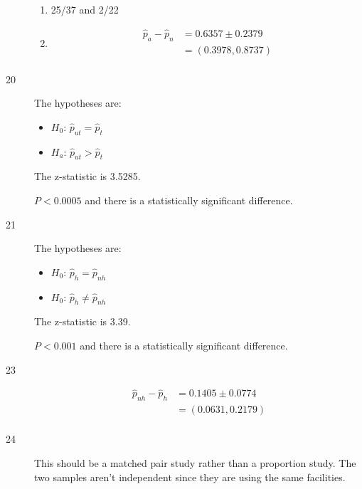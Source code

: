 \documentclass[letterpaper]{exam}
\begin{document}
\begin{description}
\begin{enumerate}[label = ({\alph*})]
          \item 25/37 and 2/22

          \item 
            \begin{align*}
              \hat{p}_{a} - \hat{p}_{n} & = 0.6357 \pm 0.2379 \\
                                        & = (0.3978, 0.8737) \\
            \end{align*}
        \end{enumerate}

      \item[20]
        The hypotheses are:
        \begin{itemize}[label = {}, itemsep = 0pt]
          \item $H_0$: $\hat{p}_{ut} = \hat{p}_{t}$
          \item $H_a$: $\hat{p}_{ut} > \hat{p}_{t}$
        \end{itemize}

        The z-statistic is 3.5285. 
        
        $P < 0.0005$ and there is a statistically significant difference. 

      \item[21]
        The hypotheses are:
        \begin{itemize}[label = {}, itemsep = 0pt]
          \item $H_0$: $\hat{p}_{h} = \hat{p}_{nh}$
          \item $H_0$: $\hat{p}_{h} \ne \hat{p}_{nh}$
        \end{itemize}

        The z-statistic is 3.39.
        
        $P < 0.001$ and there is a statistically significant difference. 

      \item[23]
        \begin{align*}
          \hat{p}_{nh} - \hat{p}_{h} & = 0.1405 \pm 0.0774 \\
                                     & = (0.0631, 0.2179) \\
        \end{align*}
        
      \item[24] This should be a matched pair study rather than a proportion study.
        The two samples aren't independent since they are using the same facilities.


\end{description}
\end{document}
